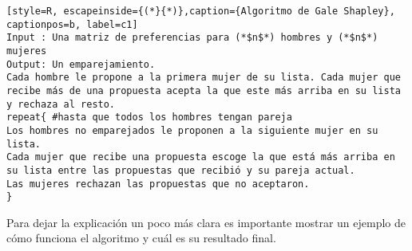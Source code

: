 \begin{lstlisting}[style=R, escapeinside={(*}{*)},caption={Algoritmo de Gale Shapley}, captionpos=b, label=c1]
Input : Una matriz de preferencias para (*$n$*) hombres y (*$n$*) mujeres 
Output: Un emparejamiento. 
Cada hombre le propone a la primera mujer de su lista. Cada mujer que recibe más de una propuesta acepta la que este más arriba en su lista y rechaza al resto. 
repeat{ #hasta que todos los hombres tengan pareja
Los hombres no emparejados le proponen a la siguiente mujer en su lista. 
Cada mujer que recibe una propuesta escoge la que está más arriba en su lista entre las propuestas que recibió y su pareja actual.
Las mujeres rechazan las propuestas que no aceptaron.
}
\end{lstlisting}
Para dejar la explicación un poco más clara es importante mostrar un ejemplo de cómo funciona el algoritmo y cuál es su resultado final.
